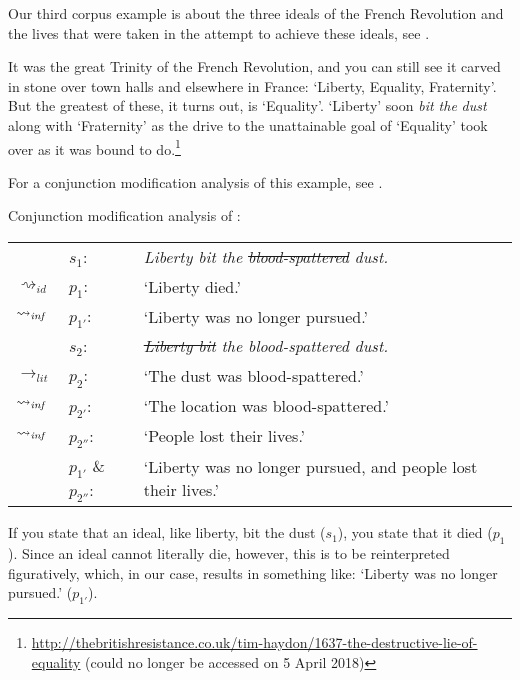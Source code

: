 \documentclass[output=paper]{langsci/langscibook}
\begin{document}
Our third corpus example is about the three ideals of the French Revolution and the lives that were taken in the attempt to achieve these ideals, see .

\ea \label{blood-spattered dust}
It was the great Trinity of the French Revolution, and you can still see it carved in stone over town halls and elsewhere in France: `Liberty, Equality, Fraternity'. But the greatest of these, it turns out, is `Equality'. `Liberty' soon \textit{bit the} \underline{} \textit{dust} along with `Fraternity' as the drive to the unattainable goal of `Equality' took over as it was bound to do.\footnote{\url{http://thebritishresistance.co.uk/tim-haydon/1637-the-destructive-lie-of-equality} 
(could no longer be accessed on 5 April 2018)}
\z\largerpage

\noindent For a conjunction modification analysis of this example, see . 

\ea \label{analysis blood-spattered dust} 
Conjunction modification analysis of :\smallskip\\
\begin{tabularx}{\linewidth}[t]{@{}llQ@{}}
& 	$s_{1}$: & \textit{Liberty bit the \sout{blood-spattered} dust.} \\
$\rightsquigarrow_{id}$				&	$p_{1}$: &  `Liberty died.' \\
$\rightsquigarrow_{\text{\itshape inf}}$	&	$p_{1'}$: & `Liberty was no longer pursued.'\medskip\\
& 	$s_{2}$: & \textit{\sout{Liberty bit} the blood-spattered dust.} \\
$\rightarrow_{lit}$	&	$p_{2}$: & `The dust was blood-spattered.' \\
$\rightsquigarrow_{\text{\itshape inf}}$	&	$p_{2'}$: & `The location was blood-spattered.' \\
$\rightsquigarrow_{\text{\itshape inf}}$	&	$p_{2''}$: & `People lost their lives.'\medskip\\
&	$p_{1'}$ \& $p_{2''}$: & `Liberty was no longer pursued, and people lost their lives.'
\end{tabularx}
\z

\noindent If you state that an ideal, like liberty, bit the dust ($s_{1}$), you state that it died ($p_{1}$). Since an ideal cannot literally die, however, this is to be reinterpreted figuratively, which, in our case, results in something like: `Liberty was no longer pursued.' ($p_{1'}$). 
\end{document}
